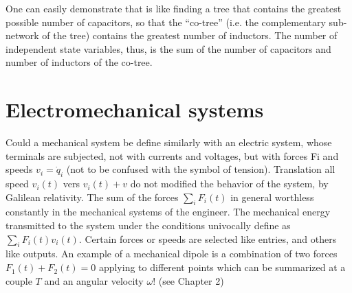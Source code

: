 
One can easily demonstrate that is like finding a tree that contains the greatest possible number of capacitors, so that the “co-tree” (i.e. the complementary sub-network of the tree) contains the greatest number of inductors.  The number of independent state variables, thus, is the sum of the number of capacitors and number of inductors of the co-tree.



\section{Electromechanical systems} 

Could a mechanical system be define similarly with an electric system, whose terminals are subjected, not with currents and voltages, but with forces Fi and speeds $v_i=\dot{q}_i$ (not to be confused with the symbol of tension). Translation all speed $v_i(t)$ vers $v_i(t)+v$ do not modified the behavior of the system, by Galilean relativity. The sum of the forces $\sum_{i} F_i(t)$ in general worthless constantly in the mechanical systems of the engineer. The mechanical energy transmitted to the system under the conditions univocally define as $\sum_i F_i(t) v_i(t)$.  Certain forces or speeds are selected like entries, and others like outputs. An example of a mechanical dipole is a combination of two forces $F_1(t)+F_2(t)=0$ applying to different points  which can be summarized at a couple $T$ and an angular velocity $\omega$! (see Chapter 2)

